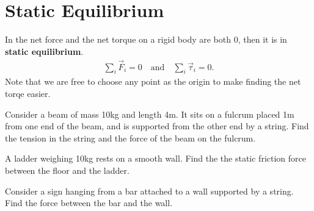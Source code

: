 \documentclass[../classical_mechanics.tex]{subfiles}
\begin{document}
    \section{Static Equilibrium}\label{sec:static-equilibrium}
        In the net force and the net torque on a rigid body are both 0, then it is in \textbf{static equilibrium}.
        \begin{eqnarray}
            \sum_i\vec{F}_i=0\quad\text{and}\quad\sum_i\vec{\tau}_i=0.
        \end{eqnarray}
        Note that we are free to choose any point as the origin to make finding the net torqe easier.
        \begin{example}
            Consider a beam of mass 10kg and length 4m.
            It sits on a fulcrum placed 1m from one end of the beam, and is supported from the other end by a string.
            Find the tension in the string and the force of the beam on the fulcrum.
        \end{example}
        \begin{example}
            A ladder weighing 10kg rests on a smooth wall.
            Find the the static friction force between the floor and the ladder.
        \end{example}
        \begin{example}
            Consider a sign hanging from a bar attached to a wall supported by a string.
            Find the force between the bar and the wall.
        \end{example}
\end{document}
